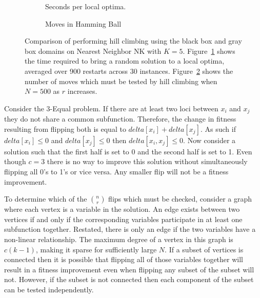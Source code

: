 \begin{figure}[t]
  \begin{centering}
    \begin{subfigure}{.5\textwidth}
      \begin{centering}
      \end{centering}
      \caption{Seconds per local optima.}
      \label{fig-hc-time}
    \end{subfigure}%
    \begin{subfigure}{.5\textwidth}
      \begin{centering}
      \end{centering}
      \caption{Moves in Hamming Ball}
      \label{fig-hc-radius}
    \end{subfigure}
  \end{centering}
  \caption{Comparison of performing hill climbing
           using the black box and gray box domains on Nearest Neighbor NK with $K=5$.
           Figure~\ref{fig-hc-time} shows the time required to bring a random
           solution to a local optima, averaged over 900 restarts across 30 instances.
           Figure~\ref{fig-hc-radius} shows the number of moves which must be
           tested by hill climbing when $N=500$ as $r$ increases.}
  \label{fig-hc-compare}
\end{figure}

Consider the 3-Equal problem.  If there are at least two loci between $x_i$ and $x_j$ they do
not share a common subfunction. Therefore, the change in fitness resulting from flipping
both is equal to $delta[x_i] + delta[x_j]$. As such if $delta[x_i] \leq 0$ and $delta[x_j] \leq 0$
then $delta[x_i,x_j] \leq 0$. Now consider a solution such that the first half is set to 0
and the second half is set to 1. Even though $c=3$ there is no way to improve this solution without
simultaneously flipping all 0's to 1's or vice versa. Any smaller flip will not
be a fitness improvement.

To determine which of the $n \choose r$ flips which must be checked, consider a graph where
each vertex is a variable in the solution. An edge exists between two vertices if and only
if the corresponding variables participate in at least one subfunction together. Restated,
there is only an edge if the two variables have a non-linear relationship. The maximum
degree of a vertex in this graph is $c(k-1)$, making it sparse for sufficiently large $N$.
If a subset of vertices is connected then it is possible that flipping all of those
variables together will result in a fitness improvement even when flipping any subset
of the subset will not. However, if the subset is not connected then each component
of the subset can be tested independently.

